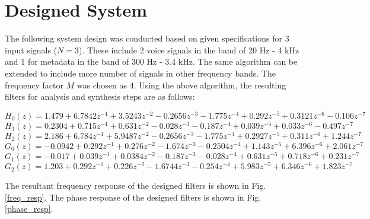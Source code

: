 \section{Designed System}
The following system design was conducted based on given specifications for 3  input signals ($N = 3$). These include 2 voice signals in the band of 20 Hz - 4 kHz and 1 for metadata in the band of 300 Hz - 3.4 kHz. The same algorithm can be extended to include more number of signals in other frequency bands. The frequency factor $M$ was chosen as 4. Using the above algorithm, the resulting filters for analysis and synthesis steps are as follows:

\[ 
 H_0(z) = 1.479  + 6.7842 z^{-1} + 3.5243 z^{-2} - 0.2656 z^{-3} - 1.775 z^{-4} + 0.292 z^{-5} + 0.3121 z^{-6} - 0.106 z^{-7}
\]
\[
H_1(z) = 0.2304 + 0.715 z^{-1} + 0.631 z^{-2} - 0.028 z^{-3} - 0.187 z^{-4} + 0.039 z^{-5} + 0.033 z^{-6} - 0.497 z^{-7}
\]
\[
H_2(z) = 2.186 + 6.784 z^{-1} + 5.9487 z^{-2} - 0.2656 z^{-3} - 1.775 z^{-4} + 0.2927 z^{-5} + 0.311 z^{-6} + 1.244z^{-7}
\]
\[ 
 G_0(z) = -0.0942 + 0.292 z^{-1} + 0.276 z^{-2} - 1.674 z^{-3} - 0.2504 z^{-4} + 1.143 z^{-5} + 6.396 z^{-6} + 2.061 z^{-7}
\]
\[ 
 G_1(z) = -0.017 + 0.039 z^{-1} + 0.0384 z^{-2} - 0.187 z^{-3} - 0.028 z^{-4} + 0.631 z^{-5} + 0.718 z^{-6} + 0.231 z^{-7}
\]
\[
G_2(z) =  1.203 + 0.292 z^{-1} + 0.226 z^{-2} - 1.6744 z^{-3} - 0.254 z^{-4} + 5.983 z^{-5} + 6.346 z^{-6} + 1.823 z^{-7}
\]

The resultant frequency response of the designed filters is shown in Fig. \ref{freq_resp}. The phase response of the designed filters is shown in Fig. \ref{phase_resp}.

